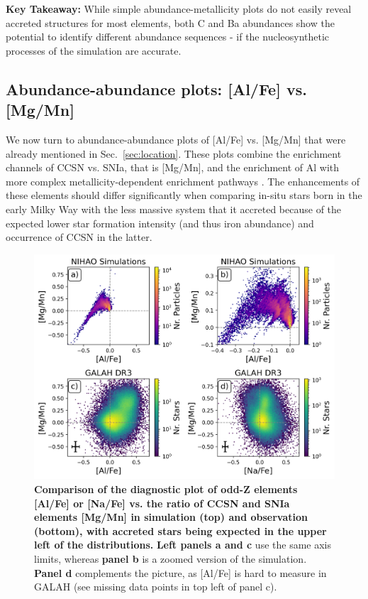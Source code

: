 \documentclass[fleqn,usenatbib]{mnras}
\begin{document}
\textbf{Key Takeaway:} While simple abundance-metallicity plots do not easily reveal accreted structures for most elements, both C and Ba abundances show the potential to identify different abundance sequences - if the nucleosynthetic processes of the simulation are accurate.

\subsection{Abundance-abundance plots: [Al/Fe] vs. [Mg/Mn]} \label{sec:alfe_mgmn}

We now turn to abundance-abundance plots of [Al/Fe] vs. [Mg/Mn] that were already mentioned in Sec.~\ref{sec:location}. These plots combine the enrichment channels of CCSN vs. SNIa, that is [Mg/Mn], and the enrichment of Al with more complex metallicity-dependent enrichment pathways \citep{Hawkins2015, Das2020, Kobayashi2020}. The enhancements of these elements should differ significantly when comparing in-situ stars born in the early Milky Way with the less massive system that it accreted because of the expected lower star formation intensity (and thus iron abundance) and occurrence of CCSN in the latter. 

\begin{figure}
	\includegraphics[width=\columnwidth]{figures/mgmn_alfe.png}
    \caption{
    \textbf{Comparison of the diagnostic plot of odd-Z elements [Al/Fe] or [Na/Fe] vs. the ratio of CCSN and SNIa elements [Mg/Mn] in simulation (top) and observation (bottom), with accreted stars being expected in the upper left of the distributions.}
    \textbf{Left panels a and c} use the same axis limits, whereas \textbf{panel b} is a zoomed version of the simulation. \textbf{Panel d} complements the picture, as [Al/Fe] is hard to measure in GALAH (see missing data points in top left of panel c).
    }
    \label{fig:NaFe_MgMn_selection_Age_FeH_dissection}
\end{figure}
\end{document}
